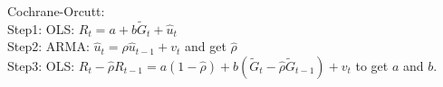 Cochrane-Orcutt:\\
Step1: OLS: $R_t=a+b \tilde{G}_t+\hat{u}_t$\\
Step2: ARMA: $\hat{u}_t=\rho \hat{u}_{t-1}+v_t$ and get $\hat{\rho}$\\
Step3: OLS: $R_t-\hat{\rho} R_{t-1}=a(1-\hat{\rho})+b\left(\tilde{G}_t-\hat{\rho} \tilde{G}_{t-1}\right)+v_t$ to get $a$ and $b$.\\







































































